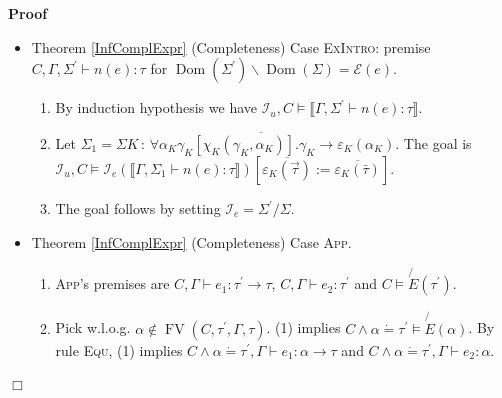 \documentclass{article}
\newcommand{\assign}{:=}
\newcommand{\colons}{\,:\,}
\newcommand{\nin}{\not\in}
\newcommand{\tmname}[1]{\textsc{#1}}
\newcommand{\tmop}[1]{\ensuremath{\operatorname{#1}}}
\newenvironment{proof}{\noindent\textbf{Proof\ }}{\hspace*{\fill}$\Box$\medskip}
\begin{document}
\begin{proof}
\begin{itemize}
\begin{enumerate}
      \item By weakening, {\tmname{Equ}}, {\tmname{Hide}} and
      {\tmname{ExAbs}}, we have $\llbracket \Gamma \vdash \lambda \bar{c} :
      \tau \rrbracket \wedge \tmop{RetType} \left( \tau, {\nobreak} \alpha_0
      \right) \wedge \exists \alpha_1 . \alpha_0 \dot{=} \varepsilon_K
      (\alpha_1), \Gamma \vdash \lambda_K \bar{c} : \tau$.
      
      \item By weakening, this yields the goal.
    \end{enumerate}
    \item Theorem \ref{InfComplExpr} (Completeness) Case {\tmname{ExIntro}}:
    premise $C, \Gamma, \Sigma^{\prime} \vdash n (e) : \tau$ for $\tmop{Dom}
    (\Sigma^{\prime}) \backslash \tmop{Dom} (\Sigma) =\mathcal{E} (e)$.
    \begin{enumerate}
      \item By induction hypothesis we have $\mathcal{I}_u, C \vDash
      \llbracket \Gamma, \Sigma^{\prime} \vdash n (e) : \tau \rrbracket$.
      
      \item Let $\Sigma_1 = \Sigma \overline{K \colons \forall \alpha_K
      \gamma_K [\chi_K (\gamma_K, \alpha_K)] . \gamma_K \rightarrow
      \varepsilon_K (\alpha_K)}$. The goal is $\mathcal{I}_u, C \vDash
      \mathcal{I}_e (\llbracket \Gamma, \Sigma_1 \vdash n (e) : \tau
      \rrbracket) [\overline{\varepsilon_K (\vec{\tau})} \assign
      \overline{\varepsilon_K (\bar{\tau})}]$.
      
      \item The goal follows by setting $\mathcal{I}_e = \Sigma^{\prime} /
      \Sigma$.
    \end{enumerate}
    \item Theorem \ref{InfComplExpr} (Completeness) Case {\tmname{App}}.
    \begin{enumerate}
      \item {\tmname{App}}'s premises are $C, \Gamma \vdash e_1 :
      \tau^{\prime} \rightarrow \tau$, $C, \Gamma \vdash e_2 : \tau^{\prime}$
      and $C \vDash \not{E} (\tau^{\prime})$.
      
      \item Pick w.l.o.g. $\alpha \nin \tmop{FV} (C, \tau^{\prime}, \Gamma,
      \tau)$. (1) implies $C \wedge \alpha \dot{=} \tau^{\prime} \vDash
      \not{E} (\alpha)$. By rule {\tmname{Equ}}, (1) implies $C \wedge \alpha
      \dot{=} \tau^{\prime}, \Gamma \vdash e_1 : \alpha \rightarrow \tau$ and
      $C \wedge \alpha \dot{=} \tau^{\prime}, \Gamma \vdash e_2 : \alpha$.
      

\end{enumerate}
\end{itemize}
\end{proof}
\end{document}
